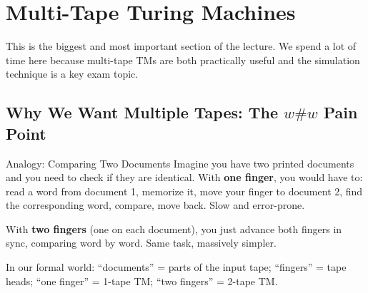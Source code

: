 \documentclass[11pt,a4paper]{article}
\begin{document}
\section{Multi-Tape Turing Machines}

This is the biggest and most important section of the lecture. We spend a lot of time here because multi-tape TMs are both practically useful and the simulation technique is a key exam topic.

\subsection{Why We Want Multiple Tapes: The $w\#w$ Pain Point}

\begin{notebox}{Analogy: Comparing Two Documents}
Imagine you have two printed documents and you need to check if they are identical. With \textbf{one finger}, you would have to: read a word from document 1, memorize it, move your finger to document 2, find the corresponding word, compare, move back. Slow and error-prone.

With \textbf{two fingers} (one on each document), you just advance both fingers in sync, comparing word by word. Same task, massively simpler.

In our formal world: ``documents'' = parts of the input tape; ``fingers'' = tape heads; ``one finger'' = 1-tape TM; ``two fingers'' = 2-tape TM.
\end{notebox}
\end{document}

